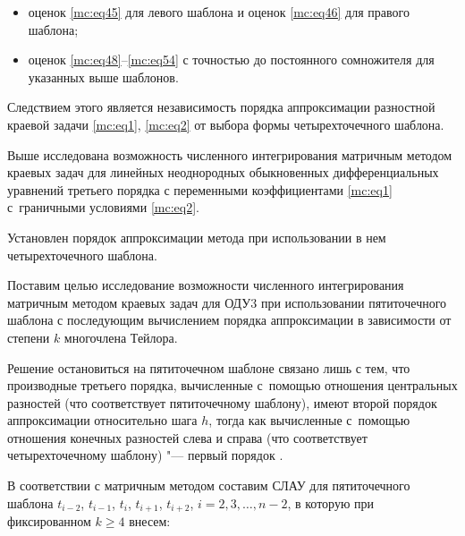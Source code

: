 \begin{itemize}

\item[а)] оценок \eqref{mc:eq45} для левого шаблона и оценок \eqref{mc:eq46} для правого шаблона;

\item[б)] оценок \eqref{mc:eq48}--\eqref{mc:eq54} с точностью до постоянного сомножителя для указанных выше шаблонов.

\end{itemize}



Следствием этого является независимость порядка аппроксимации разностной краевой задачи \eqref{mc:eq1}, \eqref{mc:eq2} от выбора формы четырехточечного шаблона.





\smallskip




Выше  исследована возможность численного интегрирования матричным методом \cite{mc:bib1} краевых задач для линейных неоднородных обыкновенных дифференциальных уравнений третьего порядка с переменными коэффициентами \eqref{mc:eq1} с~граничными условиями \eqref{mc:eq2}.

Установлен порядок аппроксимации метода при использовании в нем четырехточечного шаблона.



Поставим целью исследование возможности численного интегрирования матричным методом краевых задач для ОДУ3 при использовании пятиточечного шаблона с последующим вычислением порядка аппроксимации в зависимости от степени $k$ многочлена Тейлора.



Решение остановиться  на пятиточечном шаблоне связано лишь с тем, что производные третьего порядка, вычисленные с~помощью отношения центральных разностей (что соответствует пятиточечному шаблону), имеют второй порядок аппроксимации относительно шага $h$, тогда как вычисленные с~помощью отношения конечных разностей слева и справа (что соответствует четырехточечному шаблону) "--- первый порядок \cite{mc:bib7}.



В соответствии с матричным методом составим СЛАУ для пятиточечного шаблона $   t_{i-2}$,  $t_{i-1}$,  $t_i$,  $t_{i+1}$,  $t_{i+2}$, $i=2,  3,  \dots,  n-2$, в которую при фиксированном $k\geq4$ внесем:

